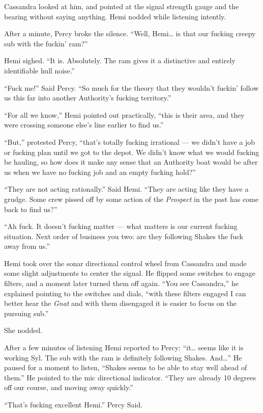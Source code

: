\documentclass[]{scrbook}
\begin{document}
Cassandra looked at him, and pointed at the signal strength gauge and
the bearing without saying anything. Hemi nodded while listening
intently.

After a minute, Percy broke the silence. ``Well, Hemi\ldots{} is that
our fucking creepy sub with the fuckin' ram?''

Hemi sighed. ``It is. Absolutely. The ram gives it a distinctive and
entirely identifiable hull noise.''

``Fuck me!'' Said Percy. ``So much for the theory that they wouldn't
fuckin' follow us this far into another Authority's fucking territory.''

``For all we know,'' Hemi pointed out practically, ``this is their area,
and they were crossing someone else's line earlier to find us.''

``But,'' protested Percy, ``that's totally fucking irrational --- we
didn't have a job or fucking plan until we got to the depot. We didn't
know what we would fucking be hauling, so how does it make any sense
that an Authority boat would be after us when we have no fucking job and
an empty fucking hold?''

``They are not acting rationally.'' Said Hemi. ``They are acting like
they have a grudge. Some crew pissed off by some action of the
\emph{Prospect} in the past has come back to find us?''

``Ah fuck. It doesn't fucking matter --- what matters is our current
fucking situation. Next order of business you two: are they following
Shakes the fuck away from us.''

Hemi took over the sonar directional control wheel from Cassandra and
made some slight adjustments to center the signal. He flipped some
switches to engage filters, and a moment later turned them off again.
``You see Cassandra,'' he explained pointing to the switches and dials,
``with these filters engaged I can better hear the \emph{Gnat} and with
them disengaged it is easier to focus on the pursuing sub.''

She nodded.

After a few minutes of listening Hemi reported to Percy: ``it\ldots{}
seems like it is working Syl. The sub with the ram is definitely
following Shakes. And\ldots{}'' He paused for a moment to listen,
``Shakes seems to be able to stay well ahead of them.'' He pointed to
the mic directional indicator. ``They are already 10 degrees off our
course, and moving away quickly.''

``That's fucking excellent Hemi.'' Percy Said.
\end{document}
